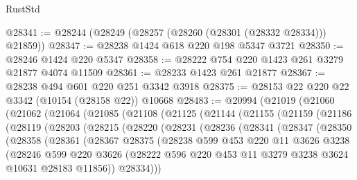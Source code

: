 \begin{lexlean}{RustStd}
\begin{coremodule}
@28341 := @28244 (@28249 (@28257 (@28260 (@28301 (@28332 @28334))) @21859))
@28347 := @28238 @1424 @618 @220 @198 @5347 @3721
@28350 := @28246 @1424 @220 @5347
@28358 := @28222 @754 @220 @1423 @261 @3279 @21877 @4074 @11509
@28361 := @28233 @1423 @261 @21877
@28367 := @28238 @494 @601 @220 @251 @3342 @3918
@28375 := @28153 @22 @220 @22 @3342 (@10154 (@28158 @22)) @10668
@28483 := @20994
    (@21019
      (@21060
        (@21062
          (@21064
            (@21085
              (@21108
                (@21125
                  (@21144
                    (@21155
                      (@21159
                        (@21186
                          (@28119
                            (@28203
                              (@28215
                                (@28220
                                  (@28231
                                    (@28236
                                      (@28341
                                        (@28347
                                          (@28350
                                            (@28358
                                              (@28361
                                                (@28367
                                                  @28375
                                                  (@28238
                                                    @599
                                                    @453
                                                    @220
                                                    @11
                                                    @3626
                                                    @3238
                                                    (@28246
                                                      @599
                                                      @220
                                                      @3626
                                                      (@28222
                                                        @596
                                                        @220
                                                        @453
                                                        @11
                                                        @3279
                                                        @3238
                                                        @3624
                                                        @10631
                                                        @28183
                                                        @11856))
                                                    @28334)))

\end{coremodule}
\end{lexlean}
